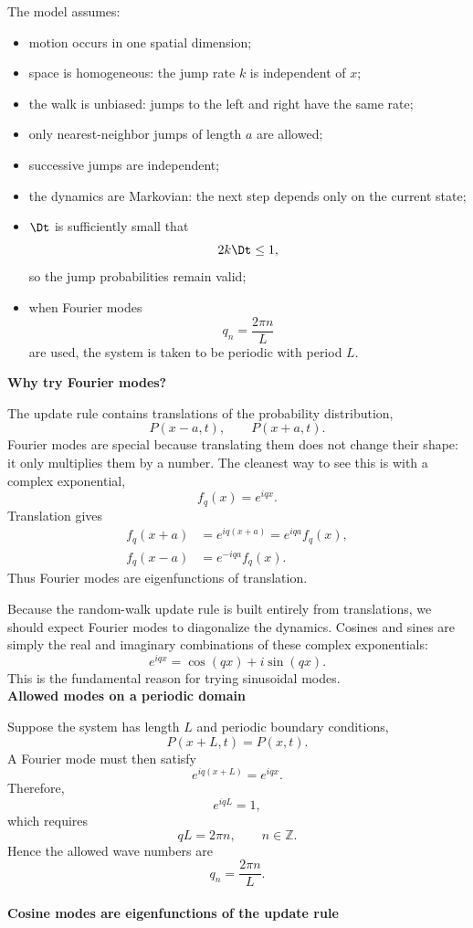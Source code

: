 The model assumes:
\begin{itemize}
    \item motion occurs in one spatial dimension;
    \item space is homogeneous: the jump rate $k$ is independent of $x$;
    \item the walk is unbiased: jumps to the left and right have the same rate;
    \item only nearest-neighbor jumps of length $a$ are allowed;
    \item successive jumps are independent;
    \item the dynamics are Markovian: the next step depends only on the current state;
    \item $\Dt$ is sufficiently small that
    \[
        2k\Dt \leq 1,
    \]
    so the jump probabilities remain valid;
    \item when Fourier modes
    \[
        q_n=\frac{2\pi n}{L}
    \]
    are used, the system is taken to be periodic with period $L$.
\end{itemize}
% 
% 
\medskip
\textbf{Why try Fourier modes?}

The update rule contains translations of the probability distribution,
\[
    P(x-a,t), \qquad P(x+a,t).
\]
Fourier modes are special because translating them does not change their shape: it only multiplies them by a number.
The cleanest way to see this is with a complex exponential,
\[
    f_q(x) = e^{iqx}.
\]
Translation gives
\begin{align*}
    f_q(x+a) &= e^{iq(x+a)} = e^{iqa}f_q(x),
    \\
    f_q(x-a) &= e^{-iqa}f_q(x).
\end{align*}
Thus Fourier modes are eigenfunctions of translation.

Because the random-walk update rule is built entirely from translations, we should expect Fourier modes to diagonalize the dynamics.
Cosines and sines are simply the real and imaginary combinations of these complex exponentials:
\[
    e^{iqx} = \cos(qx) + i\sin(qx).
\]
This is the fundamental reason for trying sinusoidal modes.
% 
% 
\medskip
\\
\textbf{Allowed modes on a periodic domain}

Suppose the system has length $L$ and periodic boundary conditions,
\[
    P(x+L,t) = P(x,t).
\]
A Fourier mode must then satisfy
\[
    e^{iq(x+L)} = e^{iqx}.
\]
Therefore,
\[
    e^{iqL}=1,
\]
which requires
\[
    qL=2\pi n, \qquad n\in\mathbb{Z}.
\]
Hence the allowed wave numbers are
\[
    \boxed{
        q_n = \frac{2\pi n}{L}.
    }
\]
% 
\medskip
\\
\textbf{Cosine modes are eigenfunctions of the update rule}

